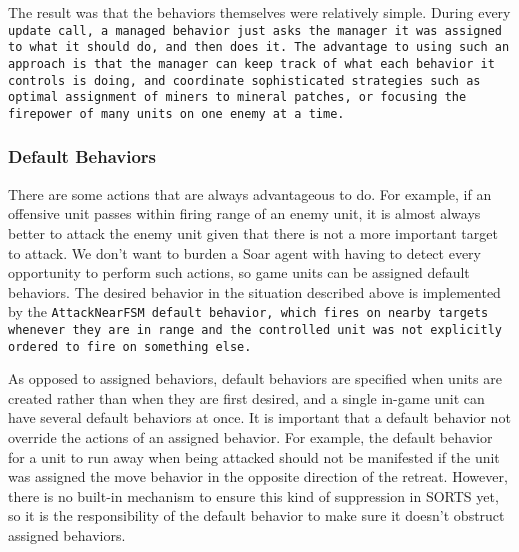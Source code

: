 \documentclass{report}
\begin{document}
The result was that the behaviors themselves were relatively simple.
During every \tt{update} call, a managed behavior just asks the manager
it was assigned to what it should do, and then does it. The advantage to
using such an approach is that the manager can keep track of what each
behavior it controls is doing, and coordinate sophisticated strategies
such as optimal assignment of miners to mineral patches, or focusing the
firepower of many units on one enemy at a time.

\subsubsection{Default Behaviors}

There are some actions that are always advantageous to do. For example,
if an offensive unit passes within firing range of an enemy unit, it is
almost always better to attack the enemy unit given that there is not a
more important target to attack. We don't want to burden a Soar agent
with having to detect every opportunity to perform such actions, so
game units can be assigned default behaviors. The desired behavior in
the situation described above is implemented by the \tt{AttackNearFSM}
default behavior, which fires on nearby targets whenever they are in
range and the controlled unit was not explicitly ordered to fire on
something else.

As opposed to assigned behaviors, default behaviors are specified
when units are created rather than when they are first desired, and
a single in-game unit can have several default behaviors at once.
It is important that a default behavior not override the actions
of an assigned behavior. For example, the default behavior for a
unit to run away when being attacked should not be manifested if the
unit was assigned the move behavior in the opposite direction of the
retreat. However, there is no built-in mechanism to ensure this kind of
suppression in SORTS yet, so it is the responsibility of the default
behavior to make sure it doesn't obstruct assigned behaviors.
\end{document}
